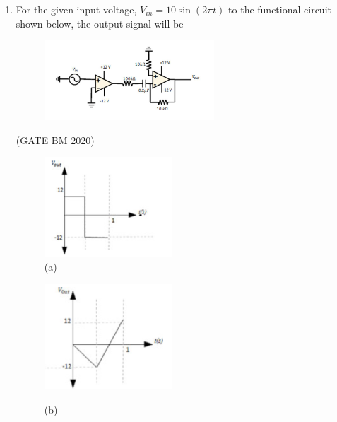 \documentclass[journal]{IEEEtran}
\begin{document}
\begin{enumerate}
\item  For the given input voltage, $V_{in} = 10 \sin(2 \pi t)$ to the functional circuit shown below, the output signal will be

\begin{figure}[H]
	\centering                                  
	\includegraphics[width=0.6\textwidth]{Screenshot_2025_0822_155855.png}
 \caption{}
   \label{fig:Q38}                                   
\end{figure}
      
      
      \hfill(GATE BM 2020)
\begin{multicols}{2}

	 \begin{figure}[H]
\includegraphics[width=0.45\textwidth]{Screenshot_2025_0822_155912.png}  
	 \caption*{(a)}
  \label{fig:Q38option1}
 \end{figure}
 
  \begin{figure}[H]
  \includegraphics[width=0.45\textwidth]{Screenshot_2025_0822_155921.png} \\
        \caption*{(b)}
   \label{fig:Q38option2}
   \end{figure}
 

\end{multicols}
\end{enumerate}
\end{document}
